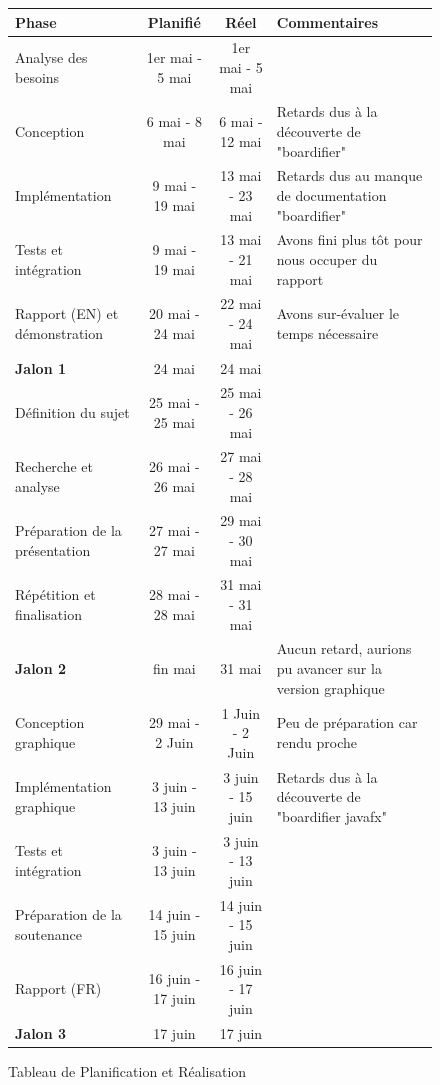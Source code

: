 \begin{figure}[h]
	\begin{tabularx}{\textwidth}{|X|c|c|X|}
		\hline
		\textbf{Phase} & \textbf{Planifié} & \textbf{Réel} & \textbf{Commentaires} \\
		\hline
		Analyse des besoins & 1er mai - 5 mai & 1er mai - 5 mai & \\
		\hline
		Conception & 6 mai - 8 mai & 6 mai - 12 mai & Retards dus à la découverte de "boardifier" \\
		\hline
		Implémentation & 9 mai - 19 mai & 13 mai - 23 mai & Retards dus au manque de documentation "boardifier" \\
		\hline
		Tests et intégration & 9 mai - 19 mai & 13 mai - 21 mai  & Avons fini plus tôt pour nous occuper du rapport \\
		\hline
		Rapport (EN) et démonstration & 20 mai - 24 mai & 22 mai - 24 mai & Avons sur-évaluer le temps nécessaire \\
		\hline
		\textbf{Jalon 1} & 24 mai & 24 mai & \\
		\hline
		Définition du sujet & 25 mai - 25 mai & 25 mai - 26 mai & \\
		\hline
		Recherche et analyse & 26 mai - 26 mai & 27 mai - 28 mai  & \\
		\hline
		Préparation de la présentation & 27 mai - 27 mai & 29 mai - 30 mai &  \\
		\hline
		Répétition et finalisation & 28 mai - 28 mai & 31 mai - 31 mai  & \\
		\hline
		\textbf{Jalon 2} & fin mai & 31 mai  & Aucun retard, aurions pu avancer sur la version graphique \\
		\hline
		Conception graphique & 29 mai - 2 Juin & 1 Juin - 2 Juin & Peu de préparation car rendu proche \\
		\hline
		Implémentation graphique & 3 juin - 13 juin & 3 juin - 15 juin  & Retards dus à la découverte de "boardifier javafx" \\
		\hline
		Tests et intégration & 3 juin - 13 juin & 3 juin - 13 juin  & \\
		\hline
		Préparation de la soutenance & 14 juin - 15 juin & 14 juin - 15 juin  & \\
		\hline
		Rapport (FR) & 16 juin - 17 juin & 16 juin - 17 juin & \\
		\hline
		\textbf{Jalon 3} & 17 juin & 17 juin &\\
		\hline
	\end{tabularx}
	\caption{Tableau de Planification et Réalisation}
\end{figure}


